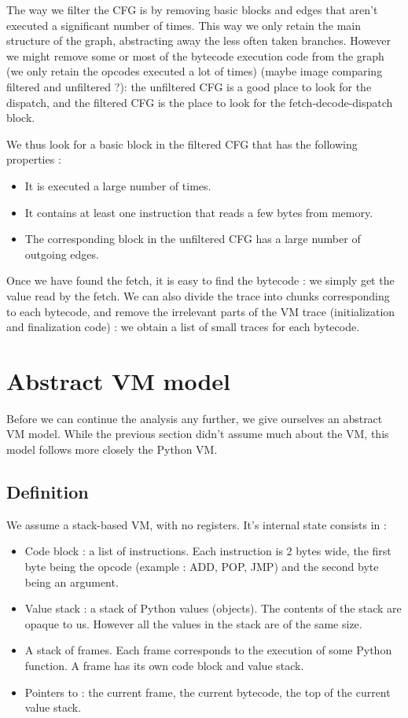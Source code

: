 \documentclass[french]{article}
\begin{document}
The way we filter the CFG is by removing basic blocks and edges that aren't executed a significant number of times. This way we only retain the main structure of the graph, abstracting away the less often taken branches. However we might remove some or most of the bytecode execution code from the graph (we only retain the opcodes executed a lot of times) (maybe image comparing filtered and unfiltered ?): the unfiltered CFG is a good place to look for the dispatch, and the filtered CFG is the place to look for the fetch-decode-dispatch block. 

We thus look for a basic block in the filtered CFG that has the following properties :
\begin{itemize}
	\item It is executed a large number of times.
	\item It contains at least one instruction that reads a few bytes from memory.
	\item The corresponding block in the unfiltered CFG has a large number of outgoing edges.
\end{itemize}

Once we have found the fetch, it is easy to find the bytecode : we simply get the value read by the fetch. We can also divide the trace into chunks corresponding to each bytecode, and remove the irrelevant parts of the VM trace (initialization and finalization code) : we obtain a list of small traces for each bytecode.

\section{Abstract VM model}

Before we can continue the analysis any further, we give ourselves an abstract VM model. While the previous section didn't assume much about the VM, this model follows more closely the Python VM.

\subsection{Definition}

We assume a stack-based VM, with no registers. It's internal state consists in :
\begin{itemize}
	\item Code block : a list of instructions. Each instruction is 2 bytes wide, the first byte being the opcode (example : ADD, POP, JMP) and the second byte being an argument.
	\item Value stack : a stack of Python values (objects). The contents of the stack are opaque to us. However all the values in the stack are of the same size.
	\item A stack of frames. Each frame corresponds to the execution of some Python function. A frame has its own code block and value stack. 
	\item Pointers to : the current frame, the current bytecode, the top of the current value stack.
\end{itemize}
\end{document}
